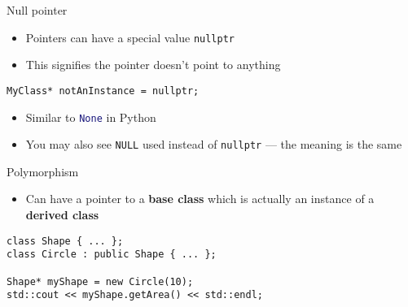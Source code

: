 \begin{frame}[fragile]{Null pointer}
    \begin{itemize}
        \item Pointers can have a special value \lstinline{nullptr} \pause
        \item This signifies the pointer doesn't point to anything \pause
    \end{itemize}
    \begin{lstlisting}
MyClass* notAnInstance = nullptr;
    \end{lstlisting}
    \pause
    \begin{itemize}
        \item Similar to \lstinline[language=Python]{None} in Python \pause
        \item You may also see \lstinline{NULL} used instead of \lstinline{nullptr} ---
            the meaning is the same
    \end{itemize}
\end{frame}


\begin{frame}[fragile]{Polymorphism}
    \begin{itemize}
        \item Can have a pointer to a \textbf{base class} which is actually an instance of a \textbf{derived class}
    \end{itemize}
    \begin{lstlisting}
class Shape { ... };
class Circle : public Shape { ... };

Shape* myShape = new Circle(10);
std::cout << myShape.getArea() << std::endl;
    \end{lstlisting}
\end{frame}
